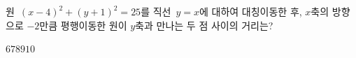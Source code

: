 원~$(x-4)^2+(y+1)^2=25$를 직선~$y=x$에 대하여 대칭이동한 후, $x$축의 방향으로 $-2$만큼 평행이동한 원이 $y$축과 만나는 두 점 사이의 거리는?
\begin{choices32}{$6$}{$7$}{$8$}{$9$}{$10$}\end{choices32}
